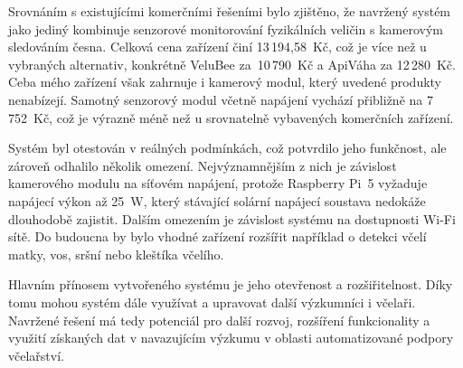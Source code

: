 Srovnáním s existujícími komerčními řešeními bylo zjištěno, že navržený systém jako jediný kombinuje senzorové monitorování fyzikálních veličin s kamerovým sledováním česna. Celková cena zařízení činí 13\,194,58~Kč, což je více než u vybraných alternativ, konkrétně VeluBee za~10\,790~Kč a ApiVáha za 12\,280~Kč. Ceba mého zařízení však zahrnuje i kamerový modul, který uvedené produkty nenabízejí. Samotný senzorový modul včetně napájení vychází přibližně na 7\,752~Kč, což je výrazně méně než u srovnatelně vybavených komerčních zařízení.

Systém byl otestován v reálných podmínkách, což potvrdilo jeho funkčnost, ale zároveň odhalilo několik omezení. Nejvýznamnějším z nich je závislost kamerového modulu na síťovém napájení, protože Raspberry Pi~5 vyžaduje napájecí výkon až 25~W, který stávající solární napájecí soustava nedokáže dlouhodobě zajistit. Dalším omezením je závislost systému na dostupnosti Wi-Fi sítě. Do budoucna by bylo vhodné zařízení rozšířit například o detekci včelí matky, vos, sršní nebo kleštíka včelího.

Hlavním přínosem vytvořeného systému je jeho otevřenost a rozšiřitelnost. Díky tomu mohou systém dále využívat a upravovat další výzkumníci i včelaři. Navržené řešení má tedy potenciál pro další rozvoj, rozšíření funkcionality a využití získaných dat v navazujícím výzkumu v oblasti automatizované podpory včelařství.
